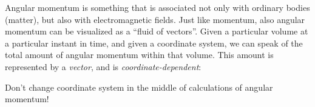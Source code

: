 \documentclass[a4paper,12pt,%
onecolumn,oneside,titlepage,%
british%
]{memoir}
\renewcommand*{\|}[1][]{\nonscript\:#1\vert\nonscript\:\mathopen{}}
\begin{document}
Angular momentum is something that is associated not only with ordinary bodies (matter), but also with electromagnetic fields. Just like momentum, also angular momentum can be visualized as a \enquote{fluid of vectors}.
%
Given a particular volume at a particular instant in time, and given a coordinate system, we can speak of the total amount of angular momentum within that volume. This amount is represented by a \emph{vector}, and is \emph{coordinate-dependent}:
\begin{warning}
  Don't change coordinate system in the middle of calculations of angular momentum!
\end{warning}

\smallskip
\end{document}
